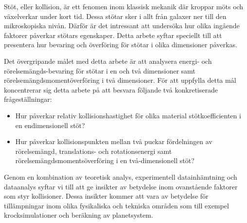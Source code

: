 Stöt, eller kollision, är ett fenomen inom klassisk mekanik där kroppar möts och växelverkar under kort tid. Dessa stötar sker i allt från galaxer ner till den mikroskopiska nivån. Därför är det intressant att undersöka hur olika ingående faktorer påverkar stötars egenskaper. Detta arbete syftar speciellt till att presentera hur bevaring och överföring för stötar i olika dimensioner påverkas.

Det övergripande målet med detta arbete är att analysera energi- och rörelsemängds-bevaring för stötar i en och två dimensioner samt rörelsemängdsmomentöverföring i två dimensioner. För att uppfylla detta mål koncentrerar sig detta arbete på att besvara följande två konkretiserade frågeställningar:

\begin{itemize}
    \item Hur påverkar relativ kollisionshastighet för olika material stötkoefficienten i en endimensionell stöt? %
    \item Hur påverkar kollisionspunkten mellan två puckar fördelningen av rörelsemängd, translations- och rotationsenergi samt rörelsemängdsmomentsöverföring i en två-dimensionell stöt?
\end{itemize}

Genom en kombination av teoretisk analys, experimentell datainhämtning och dataanalys syftar vi till att ge insikter av betydelse inom ovanstående faktorer som styr kollisioner. Dessa insikter kommer att vara av betydelse för tillämpningar inom olika fysikaliska och tekniska områden som till exempel krocksimulationer och beräkning av planetsystem.

\begin{comment}
    Här beskriver du vad laborationen går ut på, helt enkelt vad den syftar till att göra. Detta gör du för att 
(i) förbereda läsarna på resten av rapporten på ett bra sätt (ii) hjälpa läsarna att förstå på vilket sätt de 
bör läsa rapporten (så att de läser den som du vill/d. v. s. läser den på ”rätt sätt”), och för att (iii) läsarna 
ska kunna använda det som sägs här som ett slags färdriktningsvisare för läsningen av rapporten (läsare 
av den här typen av texter gillar att du skapar, och infriar, förväntningar).   
Skriv  gärna  det  här  avsnittet  i  rapporten  enligt  ett  deduktivt  mönster;  inled  med  något  generellt 
påstående, men naturligtvis ett påstående med direkt koppling till det som ska göras, t. ex. ”Då en kropp 
faller från vila påverkas den i huvudsak av två krafter”, eller något liknande. Succesivt ska texten röra 
sig från det generella till det specifika, d. v. s. syftet med undersökningen/laborationen.  
Syftet anges ibland i instruktionerna till en (lärande)laboration och då är det naturligt att använda något 
liknande den beskrivningen. I ”verklighetens” rapporter finns det sällan instruktioner för en laboration 
och då är det viktigt att man formulerar syftet med laborationen på ett mycket tydligt sätt för läsarna – i 
annat fall riskerar man att de helt missar det som rapporten är tänkt att göra; akademiska texter är texter 
som ARBETAR, texter som GÖR något för läsaren. 
\end{comment}